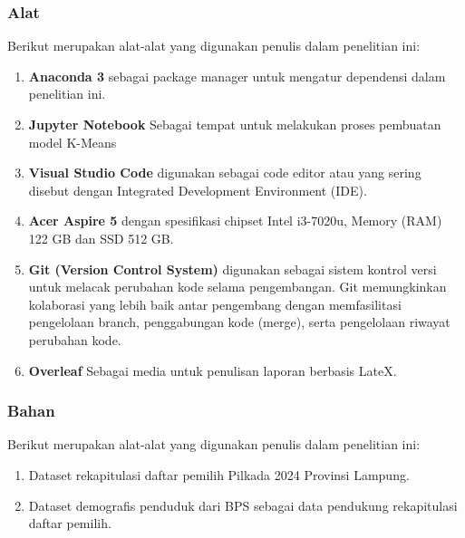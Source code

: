 \subsubsection{Alat}
Berikut merupakan alat-alat yang digunakan penulis dalam penelitian ini:
\begin{enumerate}
    \item \textbf{Anaconda 3} sebagai package manager untuk mengatur dependensi dalam penelitian ini.
    \item \textbf{Jupyter Notebook} Sebagai tempat untuk melakukan proses pembuatan model K-Means
    \item \textbf{Visual Studio Code} digunakan sebagai code editor atau yang sering disebut dengan Integrated Development Environment (IDE).
    \item \textbf{Acer Aspire 5} dengan spesifikasi chipset Intel i3-7020u, Memory (RAM) 122 GB dan SSD 512 GB.
    \item \textbf{Git (Version Control System)}  digunakan sebagai sistem kontrol versi untuk melacak perubahan kode selama pengembangan. Git memungkinkan kolaborasi yang lebih baik antar pengembang dengan memfasilitasi pengelolaan branch, penggabungan kode (merge), serta pengelolaan riwayat perubahan kode.
    \item{\textbf{Overleaf}} Sebagai media untuk penulisan laporan berbasis LateX.
\end{enumerate}

\subsubsection{Bahan}
Berikut merupakan alat-alat yang digunakan penulis dalam penelitian ini:
\begin{enumerate}
    \item Dataset rekapitulasi daftar pemilih Pilkada 2024 Provinsi Lampung.
    \item Dataset demografis penduduk dari BPS sebagai data pendukung rekapitulasi daftar pemilih.
\end{enumerate}

\newpage